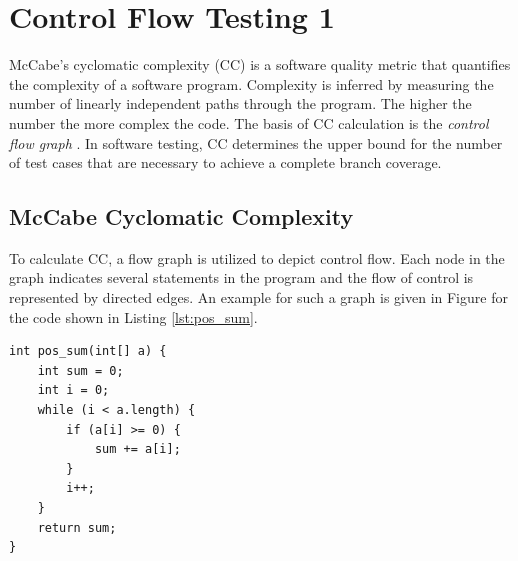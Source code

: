 \chapter{Control Flow Testing 1}
McCabe's cyclomatic complexity (CC) is a software quality metric that quantifies the complexity of a software program. Complexity is inferred by measuring the number of linearly independent paths through the program. The higher the number the more complex the code. The basis of CC calculation is the \emph{control flow graph} \autocite{spillner2021software}. In software testing, CC determines the upper bound for the number of test cases that are necessary to achieve a complete branch coverage.

\section{McCabe Cyclomatic Complexity}
To calculate CC, a flow graph is utilized to depict control flow. Each node in the graph indicates several statements in the program and the flow of control is represented by directed edges. An example for such a graph is given in Figure  for the code shown in Listing \ref{lst:pos_sum}.

\begin{lstlisting}[caption={pos\_sum finds the sum of all positive numbers stored in an integer array a. Input parameter is a, an array of integers. The output of the function is sum, the sum of integers inside the array a.},label=lst:pos_sum]
int pos_sum(int[] a) {
    int sum = 0;
    int i = 0;
    while (i < a.length) {
        if (a[i] >= 0) {
            sum += a[i];
        }
        i++;
    }
    return sum;
}
\end{lstlisting}

